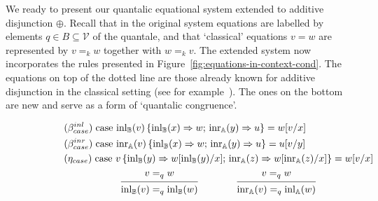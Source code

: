 \documentclass[a4paper,UKenglish,cleveref, autoref, thm-restate]{lipics-v2021}
\begin{document}
We ready to present our quantalic equational system extended to additive
disjunction $\oplus$.  Recall that in the original system equations are
labelled by elements $q \in B \subseteq \mathcal{V}$ of the quantale, and that
`classical' equations $v = w$ are represented by $v =_k w$ together with $w =_k
v$. The extended system now incorporates the rules presented in
Figure~\ref{fig:equations-in-context-cond}. The equations on top of the dotted
line are those already known for additive disjunction in the classical setting
(see for example~\cite{croleCategoriesTypes1994}). The ones on the bottom are
new and serve as a form of `quantalic congruence'.

  \begin{figure}[h!]
    \begin{equation*}
            \hspace{30pt}
        \begin{split}
          &(\beta_{case}^{inl}) \hspace{3pt} \text{case } 
          \mathrm{inl}_{\mathbb{B}}(v)\, \{ \mathrm{inl}_{\mathbb{B}} (x) \Rightarrow w 
          ;\, \mathrm{inr}_{\mathbb{A}} (y) 
          \Rightarrow u\}= w[v/x]
          \\
          &(\beta_{case}^{inr}) \hspace{3pt} \text{case } 
          \mathrm{inr}_{\mathbb{A}}(v)\, \{ \mathrm{inl}_{\mathbb{B}} (x) \Rightarrow w 
          ;\, \mathrm{inr}_{\mathbb{A}} (y) 
          \Rightarrow u\}= u[v/y]
          \\
          & (\eta_{case}) \hspace{3pt} \text{case } v\, \{\text{inl}_{\mathbb{B}} (y) \Rightarrow w [ \text{inl}_{\mathbb{B}}(y)/x] ;\, \text{inr}_{\mathbb{A}} (z) \Rightarrow w [ \text{inr}_{\mathbb{A}}(z)/x]\} = w[v/x] 
        \end{split}
    \end{equation*}
    \noindent\dotfill{}
    \begin{equation*}
            \hspace{75pt}
            \begin{prooftree}
                    \hypo{ v =_q w}
                    \infer1[]{\inl_\typeB(v) =_q \inl_\typeB(w)}
            \end{prooftree}
            \hspace{40pt}
            \begin{prooftree}
                    \hypo{ v =_q w}
                    \infer1[]{\inr_\typeA(v) =_q \inl_\typeA(w)}
            \end{prooftree}

\end{equation*}
\end{figure}
\end{document}
